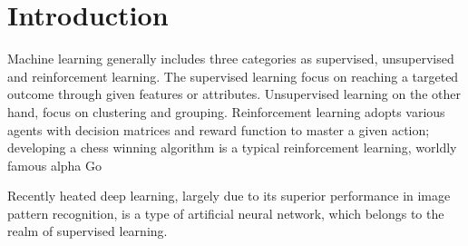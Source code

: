 \section{Introduction}

Machine learning generally includes three categories as supervised, unsupervised and reinforcement learning. The supervised learning focus on reaching a targeted outcome through given features or attributes. Unsupervised learning on the other hand, focus on clustering and grouping. Reinforcement learning adopts various agents with decision matrices and reward function to master a given action; developing a chess winning algorithm is a typical reinforcement learning, worldly famous alpha Go
\par
Recently heated deep learning, largely due to its superior performance in image pattern recognition, is a type of artificial neural network, which belongs to the realm of supervised learning. 
